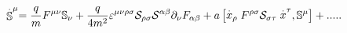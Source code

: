 \begin{equation}
\stackrel{.}{\Bbb{S}}^{\mu }=\frac{q}{m}F^{\mu \nu }\Bbb{S}_{\nu }+\frac{q}{%
4m^{2}}\varepsilon ^{\mu \nu \rho \sigma }\mathcal{S}_{\rho \sigma }%
\mathcal{S}^{\alpha \beta }\partial _{\nu }F_{\alpha \beta }+a\left[ 
\stackrel{.}{x}_{\rho }F^{\rho \sigma }\mathcal{S}_{\sigma \tau }\stackrel{.%
}{x}^{\tau },\Bbb{S}^{\mu }\right] +.....
\end{equation}

